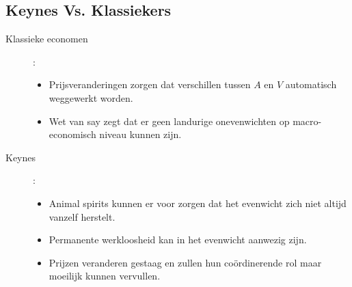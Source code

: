 \subsection{Keynes Vs. Klassiekers}
\begin{description}
    \item[Klassieke economen]:
    \begin{itemize}
        \item Prijsveranderingen zorgen dat verschillen tussen $A$ en $V$ automatisch weggewerkt worden.
        \item Wet van say zegt dat er geen landurige onevenwichten op macro-economisch niveau kunnen zijn.
    \end{itemize}

    \item[Keynes]:
    \begin{itemize}
        \item Animal spirits kunnen er voor zorgen dat het evenwicht zich niet altijd vanzelf herstelt.
        \item Permanente werkloosheid kan in het evenwicht aanwezig zijn.
        \item Prijzen veranderen gestaag en zullen hun co\"ordinerende rol maar moeilijk kunnen vervullen.
    \end{itemize}
\end{description}
